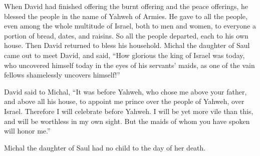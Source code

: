 {When David had finished offering the burnt offering and the peace offerings, he blessed the people in the name of Yahweh of Armies.
He gave to all the people, even among the whole multitude of Israel, both to men and women, to everyone a portion of bread, dates, and raisins. So all the people departed, each to his own house.
Then David returned to bless his household. Michal the daughter of Saul came out to meet David, and said, “How glorious the king of Israel was today, who uncovered himself today in the eyes of his servants’ maids, as one of the vain fellows shamelessly uncovers himself!”
\par }{\PP {}David said to Michal, “It was before Yahweh, who chose me above your father, and above all his house, to appoint me prince over the people of Yahweh, over Israel. Therefore I will celebrate before Yahweh.
I will be yet more vile than this, and will be worthless in my own sight. But the maids of whom you have spoken will honor me.”
\par }{\PP {}Michal the daughter of Saul had no child to the day of her death.

}

